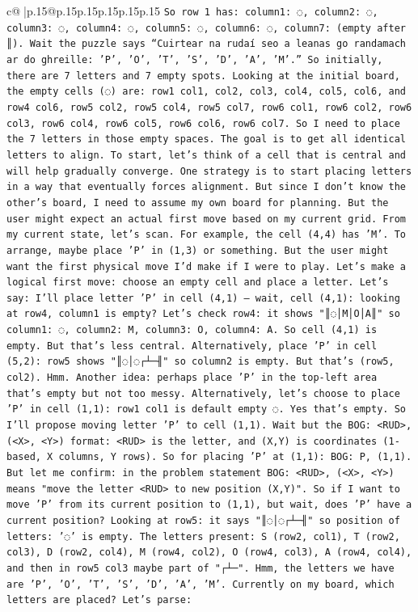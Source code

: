 \documentclass{article}
\begin{document}
{\begin{supertabular}{c@{$\;$}|p{.15\linewidth}@{}p{.15\linewidth}p{.15\linewidth}p{.15\linewidth}p{.15\linewidth}p{.15\linewidth}}
{{{\texttt{So row 1 has: column1: ◌, column2: ◌, column3: ◌, column4: ◌, column5: ◌, column6: ◌, column7: (empty after ║). Wait the puzzle says “Cuirtear na rudaí seo a leanas go randamach ar do ghreille: 'P', 'O', 'T', 'S', 'D', 'A', 'M'.” So initially, there are 7 letters and 7 empty spots. Looking at the initial board, the empty cells (◌) are: row1 col1, col2, col3, col4, col5, col6, and row4 col6, row5 col2, row5 col4, row5 col7, row6 col1, row6 col2, row6 col3, row6 col4, row6 col5, row6 col6, row6 col7. So I need to place the 7 letters in those empty spaces. The goal is to get all identical letters to align. To start, let's think of a cell that is central and will help gradually converge. One strategy is to start placing letters in a way that eventually forces alignment. But since I don't know the other's board, I need to assume my own board for planning. But the user might expect an actual first move based on my current grid. From my current state, let's scan. For example, the cell (4,4) has 'M'. To arrange, maybe place 'P' in (1,3) or something. But the user might want the first physical move I'd make if I were to play. Let's make a logical first move: choose an empty cell and place a letter. Let's say: I'll place letter 'P' in cell (4,1) – wait, cell (4,1): looking at row4, column1 is empty? Let's check row4: it shows "║◌│M│O│A║" so column1: ◌, column2: M, column3: O, column4: A. So cell (4,1) is empty. But that's less central. Alternatively, place 'P' in cell (5,2): row5 shows "║◌│◌┌┴─╢" so column2 is empty. But that's (row5, col2). Hmm. Another idea: perhaps place 'P' in the top{-}left area that's empty but not too messy. Alternatively, let's choose to place 'P' in cell (1,1): row1 col1 is default empty ◌. Yes that's empty. So I'll propose moving letter 'P' to cell (1,1). Wait but the BOG: <RUD>, (<X>, <Y>) format: <RUD> is the letter, and (X,Y) is coordinates (1{-}based, X columns, Y rows). So for placing 'P' at (1,1): BOG: P, (1,1). But let me confirm: in the problem statement BOG: <RUD>, (<X>, <Y>) means "move the letter <RUD> to new position (X,Y)". So if I want to move 'P' from its current position to (1,1), but wait, does 'P' have a current position? Looking at row5: it says "║◌│◌┌┴─╢" so position of letters: '◌' is empty. The letters present: S (row2, col1), T (row2, col3), D (row2, col4), M (row4, col2), O (row4, col3), A (row4, col4), and then in row5 col3 maybe part of "┌┴─". Hmm, the letters we have are 'P', 'O', 'T', 'S', 'D', 'A', 'M'. Currently on my board, which letters are placed? Let's parse:} \\
}}}
\end{supertabular}}
\end{document}
